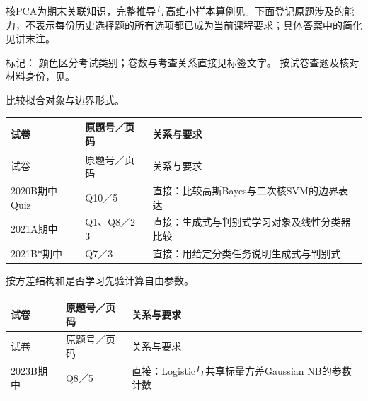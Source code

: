 核PCA为期末关联知识，完整推导与高维小样本算例见。下面登记原题涉及的能力，不表示每份历史选择题的所有选项都已成为当前课程要求；具体答案中的简化见讲末注。


标记：   颜色区分考试类别；卷数与考查关系直接见标签文字。
按试卷查题及核对材料身份，见。



比较拟合对象与边界形式。

\begingroup\small\setlength{\tabcolsep}{3pt}\renewcommand{\arraystretch}{1.22}
\begin{longtable}{@{}>{\raggedright\arraybackslash}p{}>{\raggedright\arraybackslash}p{}>{\raggedright\arraybackslash}p{}@{}}
\toprule
试卷 & 原题号／页码 & 关系与要求 \\
\midrule\endfirsthead
试卷 & 原题号／页码 & 关系与要求 \\
\midrule\endhead
\bottomrule\endfoot
2020B期中Quiz & Q10／5 & 直接：比较高斯Bayes与二次核SVM的边界表达 \\
2021A期中 & Q1、Q8／2–3 & 直接：生成式与判别式学习对象及线性分类器比较 \\
2021B*期中 & Q7／3 & 直接：用给定分类任务说明生成式与判别式 \\
\end{longtable}\endgroup



按方差结构和是否学习先验计算自由参数。

\begingroup\small\setlength{\tabcolsep}{3pt}\renewcommand{\arraystretch}{1.22}
\begin{longtable}{@{}>{\raggedright\arraybackslash}p{}>{\raggedright\arraybackslash}p{}>{\raggedright\arraybackslash}p{}@{}}
\toprule
试卷 & 原题号／页码 & 关系与要求 \\
\midrule\endfirsthead
试卷 & 原题号／页码 & 关系与要求 \\
\midrule\endhead
\bottomrule\endfoot
2023B期中 & Q8／5 & 直接：Logistic与共享标量方差Gaussian NB的参数计数 \\
\end{longtable}\endgroup

